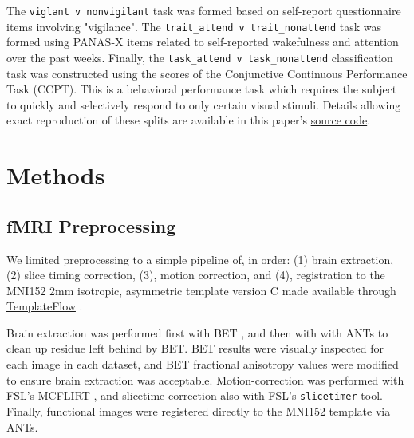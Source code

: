 \documentclass[12pt]{spieman}  %
\newcommand{\code}[1]{\small\texttt{#1}\normalsize}
\begin{document}
\begin{spacing}{2}
The \code{viglant v nonvigilant} task was formed based on self-report
questionnaire items involving
"vigilance"\cite{gorgolewskiCorrespondenceIndividualDifferences2014}. The
\code{trait\_attend v trait\_nonattend} task was formed using PANAS-X
\cite{watsonPANASXManualPositive1994} items related to self-reported
wakefulness and attention over the past weeks. Finally, the
\code{task\_attend v task\_nonattend} classification task was constructed
using the scores of the Conjunctive Continuous Performance Task
(CCPT\cite{shalevConjunctiveContinuousPerformance2011}). This is a behavioral
performance task which requires the subject to quickly and selectively respond
to only certain visual stimuli. Details allowing exact reproduction of these
splits are available in this paper's
\href{https://github.com/DM-Berger/random-matrix-fmri/blob/master/code/rmt/preprocess/unify\_attention\_data.py}{source
code}.



\section{Methods}
\label{sec:methods}

\subsection{fMRI Preprocessing}
\label{sec:preproc}


We limited preprocessing to a simple pipeline of, in order: (1) brain
extraction, (2) slice timing correction, (3), motion correction, and (4),
registration to the MNI152
\cite{fonovUnbiasedAverageAgeappropriate2011,fonovUnbiasedNonlinearAverage2009}
2mm isotropic, asymmetric template version C made available through
\href{https://www.templateflow.org/}{TemplateFlow}
\cite{ciricTemplateFlowFAIRsharingMultiscale2021}.

Brain extraction was performed first with BET
\cite{smithFastRobustAutomated2002}, and then with with
ANTs\cite{avantsReproducibleEvaluationANTs2011} to clean up residue left behind
by BET. BET results were visually inspected for each image in each dataset, and
BET fractional anisotropy values were modified to ensure brain extraction was
acceptable. Motion-correction was performed with FSL's MCFLIRT
\cite{jenkinsonImprovedOptimizationRobust2002}, and slicetime correction also
with FSL's \code{slicetimer}\cite{jenkinsonFSL2012} tool. Finally, functional
images were registered directly to the MNI152 template via
ANTs\cite{avantsReproducibleEvaluationANTs2011}.


\end{spacing}
\end{document}
